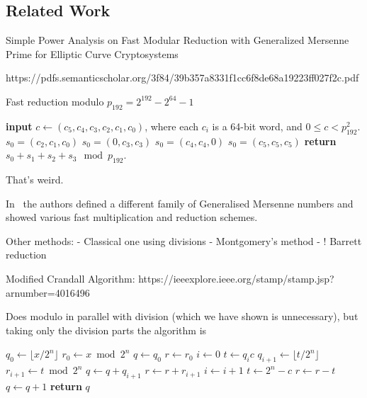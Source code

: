 
\subsection{Related Work}

Simple Power Analysis on Fast Modular Reduction with
Generalized Mersenne Prime for Elliptic Curve Cryptosystems

https://pdfs.semanticscholar.org/3f84/39b357a8331f1cc6f8de68a19223ff027f2c.pdf

\begin{algorithm}
   \caption{Fast reduction modulo $p_{192} = 2^{192} - 2^{64} - 1$}
   \begin{algorithmic}
      \State \textbf{input} $c \gets (c_5, c_4, c_3, c_2, c_1, c_0)$, where each $c_i$ is a 64-bit word, and $0 \le c < p^2_{192}$.
      \State $s_0 = (c_2, c_1, c_0)$
      \State $s_0 = (0, c_3, c_3)$
      \State $s_0 = (c_4, c_4, 0)$
      \State $s_0 = (c_5, c_5, c_5)$
      \State \textbf{return} $s_0 + s_1 + s_2 + s_3 \mod p_{192}$.
   \end{algorithmic}
\end{algorithm}
That's weird.

In~\cite{granger2013generalised} the authors defined a different family of Generalised Mersenne numbers and showed various fast multiplication and reduction schemes.

Other methods:
 - Classical one using divisions
 - Montgomery's method
 - ! Barrett reduction

Modified Crandall Algorithm:
https://ieeexplore.ieee.org/stamp/stamp.jsp?arnumber=4016496

Does modulo in parallel with division (which we have shown is unnecessary), but taking only the division parts the algorithm is
\begin{algorithm}
   \begin{algorithmic}[1]
         \State $q_0 \gets \lfloor x/2^n\rfloor$
         \State $r_0 \gets x \bmod 2^n$
         \State $q \gets q_0$
         \State $r \gets r_0$
         \State $i \gets 0$
            \State $t \gets q_i c$
            \State $q_{i+1} \gets \lfloor t / 2^n\rfloor$
            \State $r_{i+1} \gets t \bmod 2^n$
            \State $q\gets q+q_{i+1}$
            \State $r\gets r+r_{i+1}$
            \State $i\gets i+1$
         \EndWhile
         \State $t \gets 2^n-c$
            \State $r\gets r-t$
            \State $q\gets q+1$
         \EndWhile
         \State\textbf{return} $q$
      \EndProcedure
   \end{algorithmic}
\end{algorithm}

